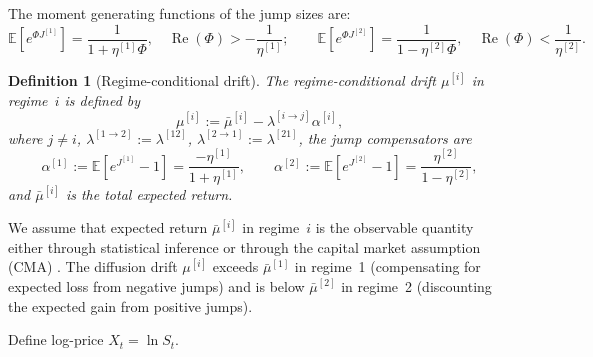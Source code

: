 \documentclass[11pt,a4paper]{article}
\numberwithin{equation}{section}
\newtheorem{definition}[theorem]{Definition}
\newcommand{\E}{\mathbb{E}}
\DeclareMathOperator{\re}{Re}
\begin{document}
The moment generating functions of the jump sizes are:
\begin{equation}\label{eq:jump_mgf}
\E[e^{\Phi J^{[1]}}] = \frac{1}{1 + \eta^{[1]} \Phi}, \quad \re(\Phi) > -\frac{1}{\eta^{[1]}}; \qquad
\E[e^{\Phi J^{[2]}}] = \frac{1}{1 - \eta^{[2]} \Phi}, \quad \re(\Phi) < \frac{1}{\eta^{[2]}}.
\end{equation}

\begin{definition}[Regime-conditional drift]\label{def:total_return}
The regime-conditional drift $\mu^{[i]}$ in regime~$i$ is defined by
\begin{equation}\label{eq:total_return}
\mu^{[i]} := \bar{\mu}^{[i]} - \lambda^{[i \to j]} \alpha^{[i]},
\end{equation}
where $j \neq i$, $\lambda^{[1 \to 2]} := \lambda^{[12]}$, $\lambda^{[2 \to 1]} := \lambda^{[21]}$, the jump compensators are
\begin{equation}\label{eq:alpha}
\alpha^{[1]} := \E[e^{J^{[1]}} - 1] = \frac{-\eta^{[1]}}{1 + \eta^{[1]}}, \qquad
\alpha^{[2]} := \E[e^{J^{[2]}} - 1] = \frac{\eta^{[2]}}{1 - \eta^{[2]}},
\end{equation}
and $\bar{\mu}^{[i]}$ is the total expected return.
\end{definition}

We assume that expected return $\bar{\mu}^{[i]}$ in regime~$i$ is the observable quantity either through statistical inference or through the capital market assumption (CMA) \citep[see][for a systematic CMA framework]{SeppHansenKastenholz2026}. The diffusion drift $\mu^{[i]}$ exceeds $\bar{\mu}^{[1]}$ in regime~1 (compensating for expected loss from negative jumps) and is below $\bar{\mu}^{[2]}$ in regime~2 (discounting the expected gain from positive jumps).



Define log-price $X_t = \ln S_t$.
\end{document}
